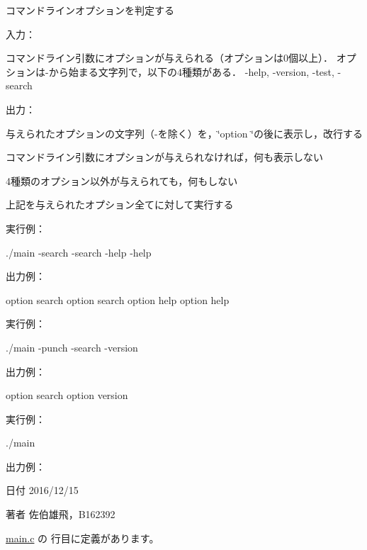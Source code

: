 コマンドラインオプションを判定する 

入力：
\begin{DoxyItemize}
\item コマンドライン引数にオプションが与えられる（オプションは0個以上）． オプションは-\/から始まる文字列で，以下の4種類がある． -\/help, -\/version, -\/test, -\/search
\end{DoxyItemize}

出力：
\begin{DoxyItemize}
\item 与えられたオプションの文字列（-\/を除く）を，\char`\"{}option \char`\"{}の後に表示し，改行する
\item コマンドライン引数にオプションが与えられなければ，何も表示しない
\item 4種類のオプション以外が与えられても，何もしない
\item 上記を与えられたオプション全てに対して実行する
\end{DoxyItemize}

実行例： \begin{DoxyVerb}./main -search -search -help -help
\end{DoxyVerb}
 出力例： \begin{DoxyVerb}option search
option search
option help
option help
\end{DoxyVerb}
 実行例： \begin{DoxyVerb}./main -punch -search -version
\end{DoxyVerb}
 出力例： \begin{DoxyVerb}option search
option version
\end{DoxyVerb}
 実行例： \begin{DoxyVerb}./main
\end{DoxyVerb}
 出力例： \begin{DoxyVerb}\end{DoxyVerb}
 \begin{DoxyDate}{日付}
2016/12/15 
\end{DoxyDate}
\begin{DoxyAuthor}{著者}
佐伯雄飛，\-B162392 
\end{DoxyAuthor}


 \hyperlink{main_8c_source}{main.\-c} の  行目に定義があります。


